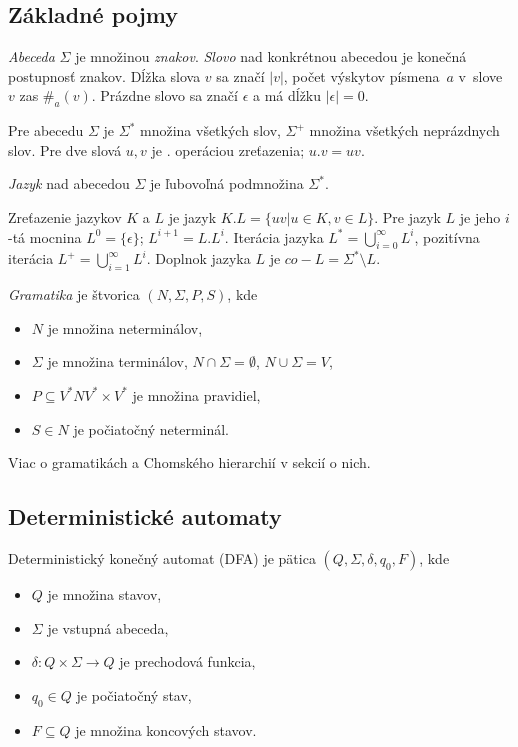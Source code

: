 \subsection{Základné pojmy}

{\em Abeceda} $\Sigma$ je množinou {\em znakov}. {\em Slovo} 
nad konkrétnou abecedou je konečná postupnosť znakov.
Dĺžka slova $v$ sa značí $|v|$, počet výskytov písmena~$a$
v~slove~$v$ zas $\#_a(v)$. Prázdne slovo sa značí $\epsilon$
a má dĺžku $|\epsilon|=0$.

Pre abecedu $\Sigma$ je $\Sigma^*$ množina všetkých slov,
$\Sigma^+$ množina všetkých neprázdnych slov. Pre dve slová
$u,v$ je $.$ operáciou zreťazenia; $u.v=uv$.

{\em Jazyk} nad abecedou $\Sigma$ je ľubovoľná podmnožina $\Sigma^*$.

Zreťazenie jazykov $K$ a $L$ je jazyk $K.L=\{ uv | u \in K, v \in L\}$.
Pre jazyk $L$ je jeho $i$-tá mocnina $L^0=\{\epsilon\}$; $L^{i+1}=L.L^i$.
Iterácia jazyka $L^*=\bigcup_{i=0}^{\infty} L^i$, pozitívna
iterácia $L^+=\bigcup_{i=1}^{\infty} L^i$. Doplnok
jazyka $L$ je $co-L=\Sigma^* \setminus L$.

\begin{definition}
	{\em Gramatika} je štvorica $(N, \Sigma, P, S)$, kde
	\begin{itemize}
		\item $N$ je množina neterminálov,
		\item $\Sigma$ je množina terminálov, $N \cap \Sigma = \emptyset$, $N \cup \Sigma = V$,
		\item $P \subseteq V^*NV^* \times V^*$ je množina pravidiel,
		\item $S \in N$ je počiatočný neterminál.
	\end{itemize}
\end{definition}

Viac o gramatikách a Chomského hierarchií v sekcií o nich.

\subsection{Deterministické automaty}

\begin{definition}
    Deterministický konečný automat (DFA) je pätica $(Q, \Sigma, \delta, q_0, F)$, kde
    \begin{itemize}
		\item $Q$ je množina stavov,
		\item $\Sigma$ je vstupná abeceda,
		\item $\delta: Q \times \Sigma \to Q$ je prechodová funkcia,
		\item $q_0 \in Q$ je počiatočný stav,
		\item $F \subseteq Q$ je množina koncových stavov.
	\end{itemize}
\end{definition}

